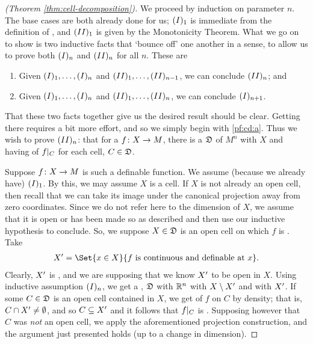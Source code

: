 \begin{proof}[\CD (Theorem \ref{thm:cell-decomposition})]
  We proceed by induction on parameter $n$. The base cases are both already done for us; $\In[1]$ is immediate from the definition of \omy, and $\IIn[1]$ is given by the Monotonicity Theorem. What we go on to show is two inductive facts that `bounce off' one another in a sense, to allow us to prove both $\In$ and $\IIn$ for all $n$. These are
  \begin{enumerate}[label=(\alph*)]
    \item \label{pf:cd:a} Given $\In[1], \hdots, \In$ and $\IIn[1], \hdots, \IIn[n-1]$, we can conclude $\IIn$; and
    \item \label{pf:cd:b} Given $\In[1], \hdots, \In$ and $\IIn[1], \hdots, \IIn[n]$, we can conclude $\In[n+1]$.
  \end{enumerate}
  That these two facts together give us the desired result should be clear.
  Getting there requires a bit more effort, and so we simply begin with \ref{pf:cd:a}.
  Thus we wish to prove $\IIn[n]$: that for a  $\funcdom{f}{X}{M}$, there is a \cd $\fancyD$ of $M^n$ \cmptble with $X$ and having \contty of $\funcrestr{f}{C}$ for each cell, $C \in \fancyD$.

  Suppose $\funcdom{f}{X}{M}$ is such a definable function. We assume (because we already have) $\In[1]$. By this, we may assume $X$ is a cell. If $X$ is not already an open cell, then recall that we can take its image under the canonical projection away from zero coordinates. Since we do not refer here to the dimension of $X$, we assume that it is open or has been made so as described and then use our inductive hypothesis to conclude. So, we suppose $X \in \fancyD$ is an open cell on which $f$ is \cont. Take
  \begin{align*}
	\Xprime = \Set{x \in X}{f \ \textrm{is \cont and \defnb at} \ x}.
  \end{align*}
  Clearly, $\Xprime$ is , and we are supposing that we know $\Xprime$ to be open in $X$. Using inductive assumption $\In[n]$, we get a \cd, $\fancyD$ with $\R^n$ \cmptble with $X \setminus \Xprime$ and with $\Xprime$. If some $C \in \fancyD$ is an open cell contained in $X$, we get \contty of $f$ on $C$  by density; that is, $C \cap \Xprime \neq \emptyset$, and so $C \subseteq \Xprime$ and it follows that $\funcrestr{f}{C}$ is \cont. Supposing however that $C$ was \emph{not} an open cell, we apply the aforementioned projection construction, and the argument just presented holds (up to a change in dimension).


\end{proof}
